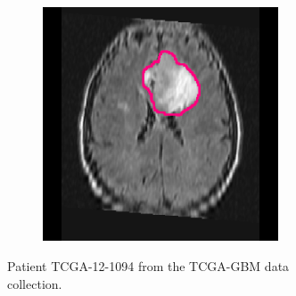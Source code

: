 \begin{subappendices}
\begin{figure}[htbp]
\begin{subfigure}[b]{0.95\textwidth}
\begin{subfigure}[b]{0.215\textwidth}
        \end{subfigure}
        \hfill
        \begin{subfigure}[b]{0.215\textwidth}
        \includegraphics[width=\textwidth, clip, trim=2.5cm 0.5cm 2.5cm 0.5cm]{Figures/Random_segs/FLAIR_TCGA-12-1094.png}
        \end{subfigure}
        \caption{Patient TCGA-12-1094 from the TCGA-GBM data collection.}
    \end{subfigure}
    \begin{subfigure}[b]{0.95\textwidth}
        \centering
        \hfill
        \begin{subfigure}[b]{0.215\textwidth}

\end{subfigure}
\end{subfigure}
\end{figure}
\end{subappendices}
